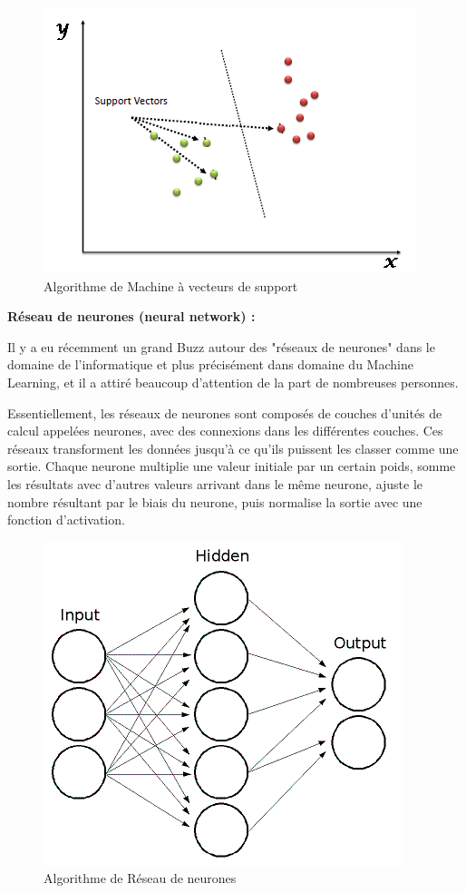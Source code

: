 \begin{figure}[H]
\begin{center}
\includegraphics[width=1\linewidth]{images/SVM.png}
\end{center}
\caption{Algorithme de Machine à vecteurs de support}
\label{fig:9}
\end{figure}



\textbf{Réseau de neurones (neural network) : }

Il y a eu récemment un grand Buzz autour des "réseaux de neurones" dans le domaine de l'informatique et plus précisément dans domaine du Machine Learning, et il a attiré beaucoup d'attention de la part de nombreuses personnes.

Essentiellement, les réseaux de neurones sont composés de couches d'unités de calcul appelées neurones, avec des connexions dans les différentes couches. Ces réseaux transforment les données jusqu'à ce qu'ils puissent les classer comme une sortie. Chaque neurone multiplie une valeur initiale par un certain poids, somme les résultats avec d'autres valeurs arrivant dans le même neurone, ajuste le nombre résultant par le biais du neurone, puis normalise la sortie avec une fonction d'activation.

\begin{figure}[H]
\begin{center}
\includegraphics[width=0.7\linewidth]{images/RN.png}
\end{center}
\caption{Algorithme de Réseau de neurones}
\label{fig:10}
\end{figure}


